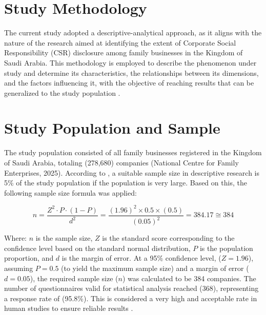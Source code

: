 \documentclass[10pt]{NSP1}
\begin{document}
\section{Study Methodology}

The current study adopted a descriptive-analytical approach, as it aligns with the nature of the research aimed at identifying the extent of Corporate Social Responsibility (CSR) disclosure among family businesses in the Kingdom of Saudi Arabia. This methodology is employed to describe the phenomenon under study and determine its characteristics, the relationships between its dimensions, and the factors influencing it, with the objective of reaching results that can be generalized to the study population \cite{AlQahtani2013}.

\section{Study Population and Sample}

The study population consisted of all family businesses registered in the Kingdom of Saudi Arabia, totaling (278,680) companies (National Centre for Family Enterprises, 2025). According to \cite{Mustafa2003}, a suitable sample size in descriptive research is 5\% of the study population if the population is very large. Based on this, the following sample size formula was applied:

\begin{equation}
n = \frac{Z^{2} \cdot P \cdot (1 - P)}{d^{2}}
= \frac{(1.96)^{2} \times 0.5 \times (0.5)}{(0.05)^{2}}
= 384.17 \cong 384
\end{equation}

Where: \(n\) is the sample size, \(Z\) is the standard score corresponding to the confidence level based on the standard normal distribution, \(P\) is the population proportion, and \(d\) is the margin of error. At a 95\% confidence level, (\(Z = 1.96\)), assuming \(P = 0.5\) (to yield the maximum sample size) and a margin of error (\(d = 0.05\)), the required sample size (\(n\)) was calculated to be 384 companies. The number of questionnaires valid for statistical analysis reached (368), representing a response rate of (95.8\%). This is considered a very high and acceptable rate in human studies to ensure reliable results \cite{Babbie2020}.
\end{document}
